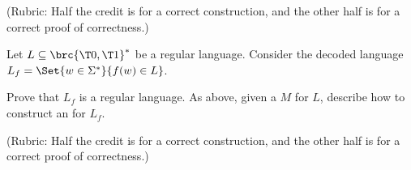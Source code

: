{\begin{questions}
       (Rubric: Half the credit is for a correct construction, and the
       other half is for a correct proof of correctness.)

           
           
           
       \medskip%
       \item {} Let $L \subseteq \brc{\T0,\T1}^*$ be a
       regular language. Consider the decoded language
       $L_f = \Set{ w \in \Sigma^*}{f(w) \in L}$.

       Prove that $L_f$ is a regular language. As above, given a \DFA
       $M$ for $L$, describe how to construct an \NFA for $L_f$.

       (Rubric: Half the credit is for a correct construction, and the
       other half is for a correct proof of correctness.)

           
           
   \end{questions}
       
}{}{}{}
    

